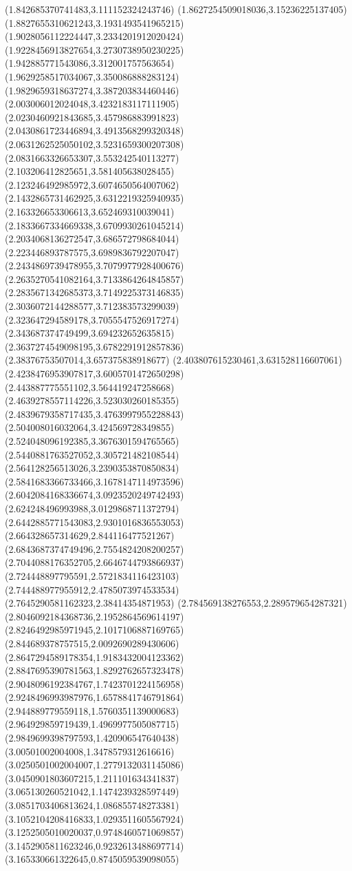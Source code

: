 {(1.842685370741483,3.111152324243746)
(1.8627254509018036,3.15236225137405)
(1.8827655310621243,3.1931493541965215)
(1.9028056112224447,3.2334201912020424)
(1.9228456913827654,3.2730738950230225)
(1.942885771543086,3.312001757563654)
(1.9629258517034067,3.350086888283124)
(1.9829659318637274,3.387203834460446)
(2.003006012024048,3.4232183117111905)
(2.0230460921843685,3.457986883991823)
(2.0430861723446894,3.4913568299320348)
(2.0631262525050102,3.5231659300207308)
(2.0831663326653307,3.553242540113277)
(2.103206412825651,3.581405638028455)
(2.123246492985972,3.6074650564007062)
(2.1432865731462925,3.6312219325940935)
(2.163326653306613,3.652469310039041)
(2.1833667334669338,3.6709930261045214)
(2.2034068136272547,3.686572798684044)
(2.223446893787575,3.6989836792207047)
(2.2434869739478955,3.7079977928400676)
(2.2635270541082164,3.7133864264845857)
(2.2835671342685373,3.7149225373146835)
(2.3036072144288577,3.712383573299039)
(2.323647294589178,3.7055547526917274)
(2.343687374749499,3.694232652635815)
(2.3637274549098195,3.6782291912857836)
(2.38376753507014,3.657375838918677)
(2.403807615230461,3.631528116607061)
(2.4238476953907817,3.6005701472650298)
(2.443887775551102,3.564419247258668)
(2.4639278557114226,3.523030260185355)
(2.4839679358717435,3.4763997955228843)
(2.504008016032064,3.424569728349855)
(2.524048096192385,3.3676301594765565)
(2.5440881763527052,3.305721482108544)
(2.564128256513026,3.2390353870850834)
(2.5841683366733466,3.1678147114973596)
(2.6042084168336674,3.0923520249742493)
(2.624248496993988,3.0129868711372794)
(2.6442885771543083,2.9301016836553053)
(2.664328657314629,2.844116477521267)
(2.6843687374749496,2.7554824208200257)
(2.7044088176352705,2.6646744793866937)
(2.724448897795591,2.5721834116423103)
(2.744488977955912,2.4785073974533534)
(2.7645290581162323,2.38414354871953)
(2.784569138276553,2.289579654287321)
(2.8046092184368736,2.1952864569614197)
(2.8246492985971945,2.1017106887169765)
(2.844689378757515,2.0092690289430606)
(2.8647294589178354,1.9183432004123362)
(2.8847695390781563,1.8292762657323478)
(2.9048096192384767,1.7423701224156958)
(2.9248496993987976,1.6578841746791864)
(2.944889779559118,1.5760351139000683)
(2.964929859719439,1.4969977505087715)
(2.9849699398797593,1.420906547640438)
(3.00501002004008,1.3478579312616616)
(3.0250501002004007,1.2779132031145086)
(3.0450901803607215,1.211101634341837)
(3.065130260521042,1.1474239328597449)
(3.0851703406813624,1.086855748273381)
(3.1052104208416833,1.0293511605567924)
(3.1252505010020037,0.9748460571069857)
(3.1452905811623246,0.9232613488697714)
(3.165330661322645,0.8745059539098055)
}
